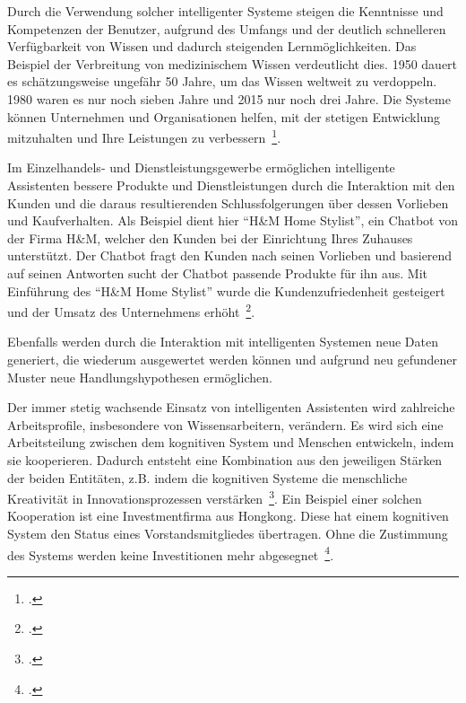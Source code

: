 Durch die Verwendung solcher intelligenter Systeme steigen die Kenntnisse und Kompetenzen der Benutzer, aufgrund des Umfangs und der deutlich schnelleren Verfügbarkeit
von Wissen und dadurch steigenden Lernmöglichkeiten. Das Beispiel der Verbreitung von medizinischem Wissen verdeutlicht dies. 1950 
dauert es schätzungsweise ungefähr 50 Jahre, um das Wissen weltweit zu verdoppeln. 1980 waren es nur noch sieben Jahre und 2015 nur noch drei Jahre.
Die Systeme können Unternehmen und Organisationen helfen, mit der stetigen Entwicklung mitzuhalten und Ihre Leistungen zu verbessern~\footcite[\vglf][]{Scherk.2017}.

Im Einzelhandels- und Dienstleistungsgewerbe ermöglichen intelligente Assistenten bessere Produkte und Dienstleistungen durch die Interaktion mit den Kunden 
und die daraus resultierenden Schlussfolgerungen über dessen Vorlieben und Kaufverhalten.
Als Beispiel dient hier \enquote{H\&M Home Stylist}, ein Chatbot von der Firma H\&M, welcher den Kunden bei der Einrichtung Ihres Zuhauses unterstützt. Der Chatbot 
fragt den Kunden nach seinen Vorlieben und basierend auf seinen Antworten sucht der Chatbot passende Produkte für ihn aus. Mit Einführung des \enquote{H\&M Home Stylist}
wurde die Kundenzufriedenheit gesteigert und der Umsatz des Unternehmens erhöht~\footcite[\vglf][]{Robot.2023}.

Ebenfalls werden durch die Interaktion mit intelligenten Systemen neue Daten generiert, die wiederum ausgewertet werden können und aufgrund neu gefundener Muster neue Handlungshypothesen
ermöglichen.

Der immer stetig wachsende Einsatz von intelligenten Assistenten wird zahlreiche Arbeitsprofile, insbesondere von Wissensarbeitern, verändern. Es wird sich eine Arbeitsteilung 
zwischen dem kognitiven System und Menschen entwickeln, indem sie kooperieren. Dadurch entsteht eine Kombination aus den jeweiligen Stärken der beiden Entitäten, z.B. indem
die kognitiven Systeme die menschliche Kreativität in Innovationsprozessen verstärken~\footcite[\vglf][]{Scherk.2017}.
Ein Beispiel einer solchen Kooperation ist eine Investmentfirma aus Hongkong. Diese hat einem kognitiven System den Status eines Vorstandsmitgliedes übertragen. Ohne die Zustimmung
des Systems werden keine Investitionen mehr abgesegnet~\footcite[\vglf][]{Scherk.2017}.

